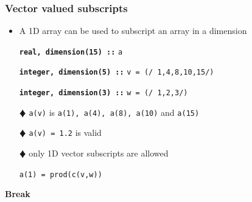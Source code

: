 \documentclass[slidestop,mathserif,compress,xcolor=svgnames]{beamer}
\begin{document}
\begin{frame}
  \frametitle{\small Vector valued subscripts}
  \begin{itemize}
    \item A 1D array can be used to subscript an array in a dimension
    \item[] \textbf{\texttt{real, dimension(15) ::}} \texttt{a}
    \item[] \textbf{\texttt{integer, dimension(5) ::}} \texttt{v = (/ 1,4,8,10,15/)}
    \item[] \textbf{\texttt{integer, dimension(3) ::}} \texttt{w = (/ 1,2,3/)}
    \item[$\vardiamond$] {\texttt{a(v)}} is {\texttt{a(1), a(4), a(8), a(10)}} and {\texttt{a(15)}}
    \item[$\vardiamond$] {\texttt{a(v) = 1.2}} is valid
    \item[$\vardiamond$] only 1D vector subscripts are allowed
    \item[] {\texttt{a(1) = prod(c(v,w))}}
  \end{itemize}
\end{frame}

\begin{frame}
  \begin{center}
      \Huge{\textbf{Break}}
  \end{center}
\end{frame}
\end{document}

